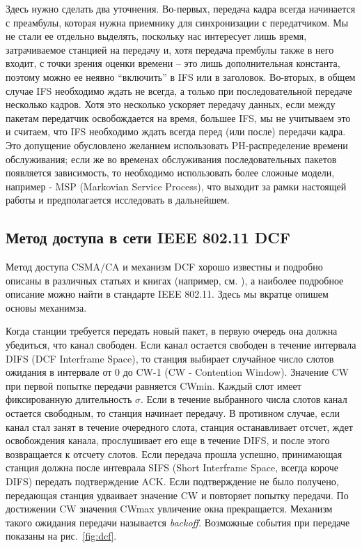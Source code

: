 Здесь нужно сделать два уточнения. Во-первых, передача кадра всегда начинается с преамбулы, которая нужна приемнику для синхронизации с передатчиком. Мы не стали ее отдельно выделять, поскольку нас интересует лишь время, затрачиваемое станцией на передачу и, хотя передача прембулы также в него входит, с точки зрения оценки времени -- это лишь дополнительная константа, поэтому можно ее неявно ``включить'' в IFS или в заголовок. Во-вторых, в общем случае IFS необходимо ждать не всегда, а только при последовательной передаче несколько кадров. Хотя это несколько ускоряет передачу данных, если между пакетам передатчик освобождается на время, большее IFS, мы не учитываем это и считаем, что IFS необходимо ждать всегда перед (или после) передачи кадра. Это допущение обусловлено желанием использовать PH-распределение времени обслуживания; если же во временах обслуживания последовательных пакетов появляется зависимость, то необходимо использовать более сложные модели, например - MSP (Markovian Service Process), что выходит за рамки настоящей работы и предполагается исследовать в дальнейшем.



\subsection{Метод доступа в сети IEEE 802.11 DCF}

Метод доступа CSMA/CA и механизм DCF хорошо известны и подробно описаны в различных статьях и книгах (например, см. \cite{Bianchi2000}), а наиболее подробное описание можно найти в стандарте IEEE 802.11. Здесь мы вкратце опишем основы механимза.

Когда станции требуется передать новый пакет, в первую очередь она должна убедиться, что канал свободен. Если канал остается свободен в течение интервала DIFS (DCF Interframe Space), то станция выбирает случайное число слотов ожидания в интервале от 0 до CW-1 (CW - Contention Window). Значение CW при первой попытке передачи равняется CWmin. Каждый слот имеет фиксированную длительность $\sigma$. Если в течение выбранного числа слотов канал остается свободным, то станция начинает передачу. В противном случае, если канал стал занят в течение очередного слота, станция останавливает отсчет, ждет освобождения канала, прослушивает его еще в течение DIFS, и после этого возвращается к отсчету слотов. Если передача прошла успешно, принимающая станция должна после интеврала SIFS (Short Interframe Space, всегда короче DIFS) передать подтверждение ACK. Если подтверждение не было получено, передающая станция удваивает значение CW и повторяет попытку передачи. По достижении CW значения CWmax увличение окна прекращается. Механизм такого ожидания передачи называется \textit{backoff}. Возможные события при передаче показаны на рис.~\ref{fig:dcf}.

